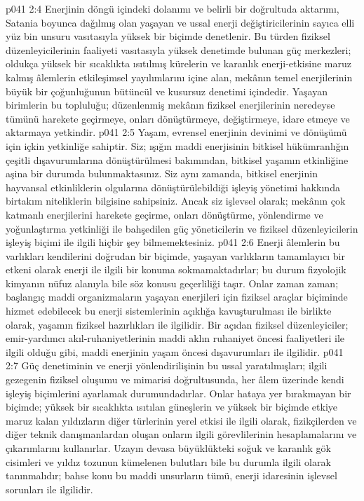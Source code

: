 \vs p041 2:4 Enerjinin döngü içindeki dolanımı ve belirli bir doğrultuda aktarımı, Satania boyunca dağılmış olan yaşayan ve ussal enerji değiştiricilerinin sayıca elli yüz bin unsuru vasıtasıyla yüksek bir biçimde denetlenir. Bu türden fiziksel düzenleyicilerinin faaliyeti vasıtasıyla yüksek denetimde bulunan güç merkezleri; oldukça yüksek bir sıcaklıkta ısıtılmış kürelerin ve karanlık enerji\hyp{}etkisine maruz kalmış âlemlerin etkileşimsel yayılımlarını içine alan, mekânın temel enerjilerinin büyük bir çoğunluğunun bütüncül ve kusursuz denetimi içindedir. Yaşayan birimlerin bu topluluğu; düzenlenmiş mekânın fiziksel enerjilerinin neredeyse tümünü harekete geçirmeye, onları dönüştürmeye, değiştirmeye, idare etmeye ve aktarmaya yetkindir.
\vs p041 2:5 Yaşam, evrensel enerjinin devinimi ve dönüşümü için içkin yetkinliğe sahiptir. Siz; ışığın maddi enerjisinin bitkisel hükümranlığın çeşitli dışavurumlarına dönüştürülmesi bakımından, bitkisel yaşamın etkinliğine aşina bir durumda bulunmaktasınız. Siz aynı zamanda, bitkisel enerjinin hayvansal etkinliklerin olgularına dönüştürülebildiği işleyiş yönetimi hakkında birtakım niteliklerin bilgisine sahipsiniz. Ancak siz işlevsel olarak; mekânın çok katmanlı enerjilerini harekete geçirme, onları dönüştürme, yönlendirme ve yoğunlaştırma yetkinliği ile bahşedilen güç yöneticilerin ve fiziksel düzenleyicilerin işleyiş biçimi ile ilgili hiçbir şey bilmemektesiniz.
\vs p041 2:6 Enerji âlemlerin bu varlıkları kendilerini doğrudan bir biçimde, yaşayan varlıkların tamamlayıcı bir etkeni olarak enerji ile ilgili bir konuma sokmamaktadırlar; bu durum fizyolojik kimyanın nüfuz alanıyla bile söz konusu geçerliliği taşır. Onlar zaman zaman; başlangıç maddi organizmaların yaşayan enerjileri için fiziksel araçlar biçiminde hizmet edebilecek bu enerji sistemlerinin açıklığa kavuşturulması ile birlikte olarak, yaşamın fiziksel hazırlıkları ile ilgilidir. Bir açıdan fiziksel düzenleyiciler; emir\hyp{}yardımcı akıl\hyp{}ruhaniyetlerinin maddi aklın ruhaniyet öncesi faaliyetleri ile ilgili olduğu gibi, maddi enerjinin yaşam öncesi dışavurumları ile ilgilidir.
\vs p041 2:7 Güç denetiminin ve enerji yönlendirilişinin bu ussal yaratılmışları; ilgili gezegenin fiziksel oluşumu ve mimarisi doğrultusunda, her âlem üzerinde kendi işleyiş biçimlerini ayarlamak durumundadırlar. Onlar hataya yer bırakmayan bir biçimde; yüksek bir sıcaklıkta ısıtılan güneşlerin ve yüksek bir biçimde etkiye maruz kalan yıldızların diğer türlerinin yerel etkisi ile ilgili olarak, fizikçilerden ve diğer teknik danışmanlardan oluşan onların ilgili görevlilerinin hesaplamalarını ve çıkarımlarını kullanırlar. Uzayın devasa büyüklükteki soğuk ve karanlık gök cisimleri ve yıldız tozunun kümelenen bulutları bile bu durumla ilgili olarak tanınmalıdır; bahse konu bu maddi unsurların tümü, enerji idaresinin işlevsel sorunları ile ilgilidir.
